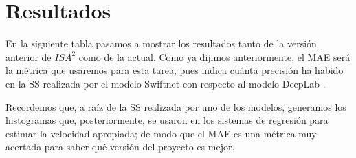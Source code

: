 \chapter{Resultados}

En la siguiente tabla pasamos a mostrar los resultados tanto de la versión anterior de $ISA^{2}$ como de la actual. Como ya dijimos anteriormente, el \ac{MAE} será la métrica que usaremos para esta tarea, pues indica cuánta precisión ha habido en la \ac{SS} realizada por el modelo Swiftnet \cite{swiftnet} con respecto al modelo DeepLab \cite{deeplab}.

Recordemos que, a raíz de la \ac{SS} realizada por uno de los modelos, generamos los histogramas que, posteriormente, se usaron en los sistemas de regresión para estimar la velocidad apropiada; de modo que el \ac{MAE} es una métrica muy acertada para saber qué versión del proyecto es mejor.

\begin{table}[H]
\centering
{}
\caption{Tabla de resultados}
\end{table}


